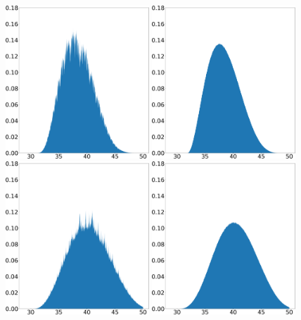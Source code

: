\begin{figure}[H]
    \centering
    \includegraphics[width=0.48\textwidth]{figure/lorenz_shadow_density_lorenz_zmax_15_28_2.67.json.png}
    \hspace{0.005\textwidth}
    \includegraphics[width=0.48\textwidth]{figure/baseline_density_lorenz_zmax_15_28_2.67.json.png}
    \\
    \includegraphics[width=0.48\textwidth]{figure/lorenz_shadow_density_lorenz_zmax_10_30_2.67.json.png}
    \hspace{0.005\textwidth}
    \includegraphics[width=0.48\textwidth]{figure/baseline_density_lorenz_zmax_10_30_2.67.json.png}

\end{figure}
